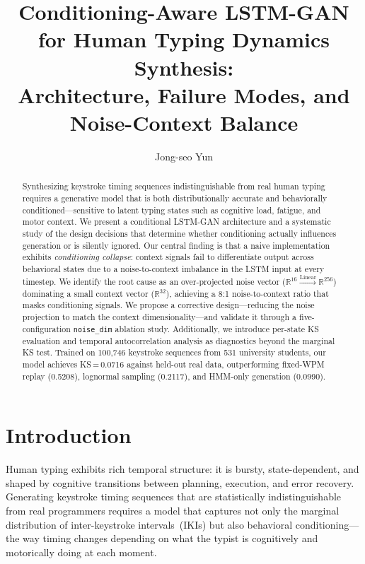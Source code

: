 \documentclass[sigconf,nonacm]{acmart}
\title{Conditioning-Aware LSTM-GAN for Human Typing Dynamics Synthesis:\\
       Architecture, Failure Modes, and Noise-Context Balance}
\author{Jong-seo Yun}
\affiliation{%
  \country{Republic of Korea}
}
\begin{document}
\begin{abstract}
Synthesizing keystroke timing sequences indistinguishable from real human typing
requires a generative model that is both distributionally accurate and
behaviorally conditioned---sensitive to latent typing states such as
cognitive load, fatigue, and motor context.
We present a conditional LSTM-GAN architecture and a systematic study of
the design decisions that determine whether conditioning actually influences
generation or is silently ignored.
Our central finding is that a naive implementation exhibits \emph{conditioning
collapse}: context signals fail to differentiate output across behavioral
states due to a noise-to-context imbalance in the LSTM input at every timestep.
We identify the root cause as an over-projected noise vector
($\mathbb{R}^{16} \xrightarrow{\text{Linear}} \mathbb{R}^{256}$) dominating
a small context vector ($\mathbb{R}^{32}$), achieving a 8:1 noise-to-context
ratio that masks conditioning signals.
We propose a corrective design---reducing the noise projection to match the
context dimensionality---and validate it through a five-configuration
\texttt{noise\_dim} ablation study.
Additionally, we introduce per-state KS evaluation and temporal autocorrelation
analysis as diagnostics beyond the marginal KS test.
Trained on 100,746 keystroke sequences from 531 university students,
our model achieves KS\,=\,0.0716 against held-out real data,
outperforming fixed-WPM replay (0.5208), lognormal sampling (0.2117),
and HMM-only generation (0.0990).
\end{abstract}


\maketitle

\section{Introduction}

Human typing exhibits rich temporal structure: it is bursty, state-dependent,
and shaped by cognitive transitions between planning, execution, and error
recovery.
Generating keystroke timing sequences that are statistically indistinguishable
from real programmers requires a model that captures not only the marginal
distribution of inter-keystroke intervals~(IKIs) but also behavioral
conditioning---the way timing changes depending on what the typist is
cognitively and motorically doing at each moment.
\end{document}
